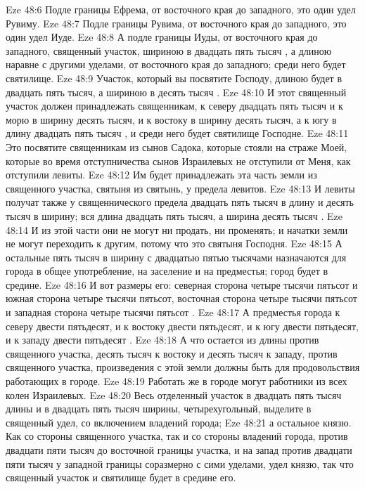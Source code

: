 \vs Eze 48:6 Подле границы Ефрема, от восточного края до западного, это один удел Рувиму.
\vs Eze 48:7 Подле границы Рувима, от восточного края до западного, это один удел Иуде.
\vs Eze 48:8 А подле границы Иуды, от восточного края до западного, священный участок, шириною в двадцать пять тысяч , а длиною наравне с другими уделами, от восточного края до западного; среди него будет святилище.
\vs Eze 48:9 Участок, который вы посвятите Господу, длиною будет в двадцать пять тысяч, а шириною в десять тысяч .
\vs Eze 48:10 И этот священный участок должен принадлежать священникам, к северу двадцать пять тысяч и к морю в ширину десять тысяч, и к востоку в ширину десять тысяч, а к югу в длину двадцать пять тысяч , и среди него будет святилище Господне.
\vs Eze 48:11 Это посвятите священникам из сынов Садока, которые стояли на страже Моей, которые во время отступничества сынов Израилевых не отступили от Меня, как отступили  левиты.
\vs Eze 48:12 Им будет принадлежать эта часть земли из священного участка, святыня из святынь, у предела левитов.
\vs Eze 48:13 И левиты получат также у священнического предела двадцать пять тысяч в длину и десять тысяч  в ширину; вся длина двадцать пять тысяч, а ширина десять тысяч .
\vs Eze 48:14 И из этой части они не могут ни продать, ни променять; и начатки земли не могут переходить к другим, потому что это святыня Господня.
\vs Eze 48:15 А остальные пять тысяч в ширину с двадцатью пятью тысячами  назначаются для города в общее употребление, на заселение и на предместья; город будет в средине.
\vs Eze 48:16 И вот размеры его: северная сторона четыре тысячи пятьсот и южная сторона четыре тысячи пятьсот, восточная сторона четыре тысячи пятьсот и западная сторона четыре тысячи пятьсот .
\vs Eze 48:17 А предместья города к северу двести пятьдесят, и к востоку двести пятьдесят, и к югу двести пятьдесят, и к западу двести пятьдесят .
\vs Eze 48:18 А что остается из длины против священного участка, десять тысяч к востоку и десять тысяч к западу, против священного участка, произведения с этой земли должны быть для продовольствия работающих в городе.
\vs Eze 48:19 Работать же в городе могут работники из всех колен Израилевых.
\vs Eze 48:20 Весь отделенный участок в двадцать пять тысяч длины и в двадцать пять тысяч ширины, четырехугольный, выделите в священный удел, со включением владений города;
\vs Eze 48:21 а остальное князю. Как со стороны священного участка, так и со стороны владений города, против двадцати пяти тысяч  до восточной границы участка, и на запад против двадцати пяти тысяч у западной границы соразмерно с сими уделами, удел князю, так что священный участок и святилище будет в средине его.
